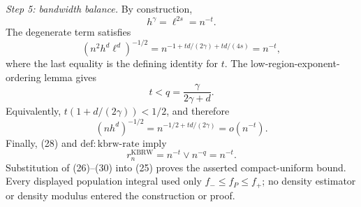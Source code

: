 \emph{Step 5: bandwidth balance.}
By construction,
\[
h^\gamma=\ell^{2s}=n^{-t}.
\tag{26}
\]
The degenerate term satisfies
\[
(n^2h^d\ell^d)^{-1/2}
=n^{-1+t d/(2\gamma)+t d/(4s)}=n^{-t},
\tag{27}
\]
where the last equality is the defining identity for \(t\).  The
low-region-exponent-ordering lemma gives
\[
t<q=\frac\gamma{2\gamma+d}.
\tag{28}
\]
Equivalently, \(t(1+d/(2\gamma))<1/2\), and therefore
\[
(nh^d)^{-1/2}
=n^{-1/2+t d/(2\gamma)}=o(n^{-t}).
\tag{29}
\]
Finally, (28) and \(\mathrm{def:kbrw\mbox{-}rate}\) imply
\[
r_n^{\mathrm{KBRW}}=n^{-t}\vee n^{-q}=n^{-t}.
\tag{30}
\]
Substitution of (26)--(30) into (25) proves the asserted compact-uniform
bound.  Every displayed population integral used only
\(f_-\leq f_P\leq f_+\); no density estimator or density modulus entered
the construction or proof.